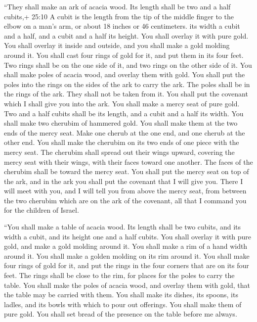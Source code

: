  ``They shall make an ark of acacia wood. Its length shall
be two and a half cubits,+ 25:10 A cubit is the length from the tip of
the middle finger to the elbow on a man's arm, or about 18 inches or 46
centimeters. its width a cubit and a half, and a cubit and a half its
height.  You shall overlay it with pure gold. You shall
overlay it inside and outside, and you shall make a gold molding around
it.  You shall cast four rings of gold for it, and put them
in its four feet. Two rings shall be on the one side of it, and two
rings on the other side of it.  You shall make poles of
acacia wood, and overlay them with gold.  You shall put the
poles into the rings on the sides of the ark to carry the ark.
 The poles shall be in the rings of the ark. They shall not
be taken from it.  You shall put the covenant which I shall
give you into the ark.  You shall make a mercy seat of pure
gold. Two and a half cubits shall be its length, and a cubit and a half
its width.  You shall make two cherubim of hammered gold.
You shall make them at the two ends of the mercy seat. 
Make one cherub at the one end, and one cherub at the other end. You
shall make the cherubim on its two ends of one piece with the mercy
seat.  The cherubim shall spread out their wings upward,
covering the mercy seat with their wings, with their faces toward one
another. The faces of the cherubim shall be toward the mercy seat.
 You shall put the mercy seat on top of the ark, and in the
ark you shall put the covenant that I will give you.  There
I will meet with you, and I will tell you from above the mercy seat,
from between the two cherubim which are on the ark of the covenant, all
that I command you for the children of Israel.

 ``You shall make a table of acacia wood. Its length shall
be two cubits, and its width a cubit, and its height one and a half
cubits.  You shall overlay it with pure gold, and make a
gold molding around it.  You shall make a rim of a hand
width around it. You shall make a golden molding on its rim around it.
 You shall make four rings of gold for it, and put the
rings in the four corners that are on its four feet.  The
rings shall be close to the rim, for places for the poles to carry the
table.  You shall make the poles of acacia wood, and
overlay them with gold, that the table may be carried with them.
 You shall make its dishes, its spoons, its ladles, and its
bowls with which to pour out offerings. You shall make them of pure
gold.  You shall set bread of the presence on the table
before me always.

